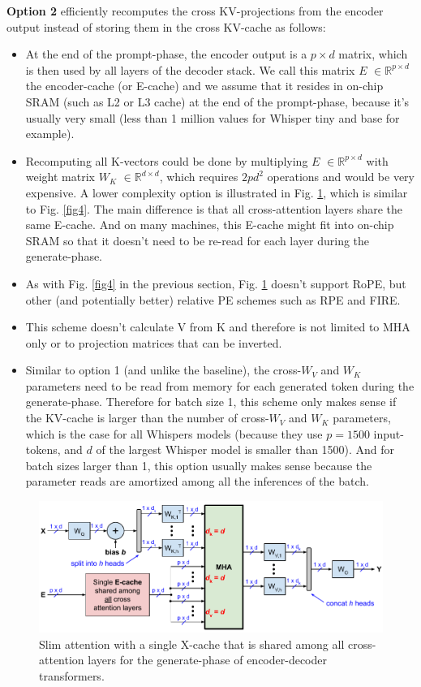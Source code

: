 \documentclass{article}
\newcommand{\eR}[2]{$\in \mathbb{R}^{#1 \times #2}$} %
\begin{document}
\textbf{Option 2} efficiently recomputes the cross KV-projections from the encoder output instead of storing them in the cross KV-cache as follows:
\begin{itemize}[topsep=-1pt]
  \item At the end of the prompt-phase, the encoder output is a $p \times d$ matrix, which is then used by all layers of the decoder stack. We call this matrix $E$ \eR{p}{d} the encoder-cache (or E-cache) and we assume that it resides in on-chip SRAM (such as L2 or L3 cache) at the end of the prompt-phase, because it’s usually very small (less than 1 million values for Whisper tiny and base for example).
  \item Recomputing all K-vectors could be done by multiplying $E$ \eR{p}{d} with weight matrix $W_K$ \eR{d}{d}, which requires $2 p d^2$ operations and would be very expensive. A lower complexity option is illustrated in Fig. \ref{fig5}, which is similar to Fig. \ref{fig4}. The main difference is that all cross-attention layers share the same E-cache. And on many machines, this E-cache might fit into on-chip SRAM so that it doesn’t need to be re-read for each layer during the generate-phase.
  \item As with Fig. \ref{fig4} in the previous section, Fig. \ref{fig5} doesn’t support RoPE, but other (and potentially better) relative PE schemes such as RPE and FIRE.
  \item This scheme doesn’t calculate V from K and therefore is not limited to MHA only or to projection matrices that can be inverted.
  \item Similar to option 1 (and unlike the baseline), the cross-$W_V$ and $W_K$ parameters need to be read from memory for each generated token during the generate-phase. Therefore for batch size 1, this scheme only makes sense if the KV-cache is larger than the number of cross-$W_V$ and $W_K$ parameters, which is the case for all Whispers models (because they use $p = 1500$ input-tokens, and $d$ of the largest Whisper model is smaller than 1500). And for batch sizes larger than 1, this option usually makes sense because the parameter reads are amortized among all the inferences of the batch.
\end{itemize}

\begin{figure}[h!] \centering
  \includegraphics[scale=0.71]{../doc/fig/slimAttn_fig5.pdf}
  \caption{Slim attention with a single X-cache that is shared among all cross-attention layers for the generate-phase of encoder-decoder transformers.}
\label{fig5} \end{figure}
\end{document}
